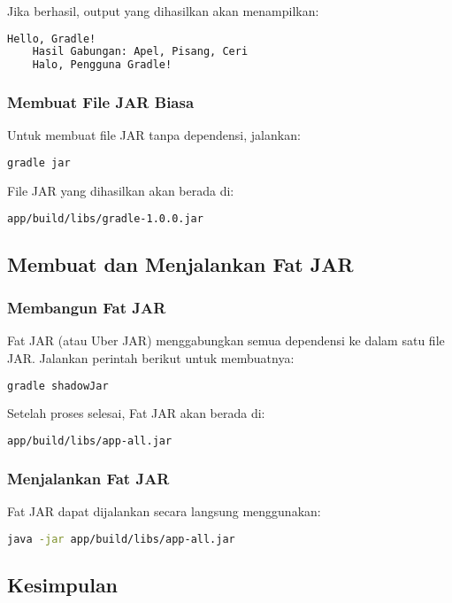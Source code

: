 Jika berhasil, output yang dihasilkan akan menampilkan:
\begin{lstlisting}[language=bash]
	Hello, Gradle!
	Hasil Gabungan: Apel, Pisang, Ceri
	Halo, Pengguna Gradle!
\end{lstlisting}

\subsubsection{Membuat File JAR Biasa}
Untuk membuat file JAR tanpa dependensi, jalankan:
\begin{lstlisting}[language=bash]
	gradle jar
\end{lstlisting}

File JAR yang dihasilkan akan berada di:
\begin{lstlisting}[language=bash]
	app/build/libs/gradle-1.0.0.jar
\end{lstlisting}

\subsection{Membuat dan Menjalankan Fat JAR}
\subsubsection{Membangun Fat JAR}
Fat JAR (atau Uber JAR) menggabungkan semua dependensi ke dalam satu file JAR. Jalankan perintah berikut untuk membuatnya:
\begin{lstlisting}[language=bash]
	gradle shadowJar
\end{lstlisting}

Setelah proses selesai, Fat JAR akan berada di:
\begin{lstlisting}[language=bash]
	app/build/libs/app-all.jar
\end{lstlisting}

\subsubsection{Menjalankan Fat JAR}
Fat JAR dapat dijalankan secara langsung menggunakan:
\begin{lstlisting}[language=bash]
	java -jar app/build/libs/app-all.jar
\end{lstlisting}

\subsection{Kesimpulan}

